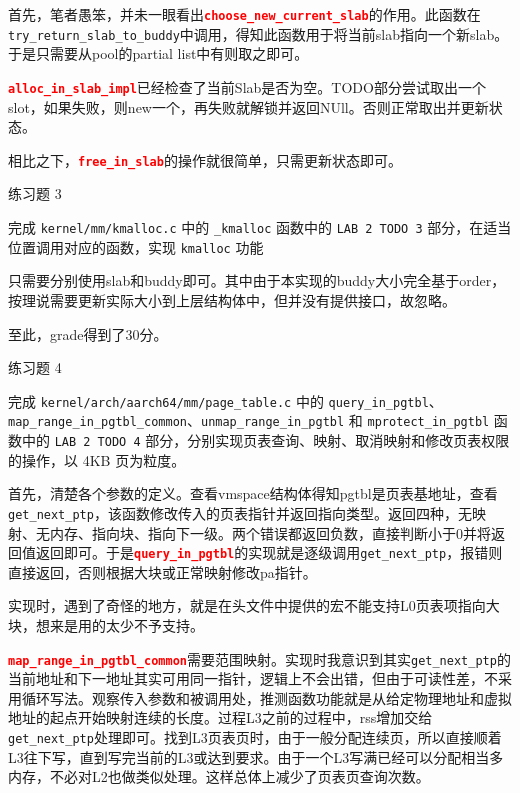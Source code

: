\documentclass{article}
\newcommand{\customthmname}{}
\newenvironment{prob}[1]
{\renewcommand{\customthmname}{#1}%
	\fontfamily{ptm}\selectfont  %
	\par\bigskip\noindent\Large{\customthmname}\normalsize\par}
{\par\bigskip}
\newcommand{\textbff}[1]{\textcolor{red}{\textbf{#1}}}
\begin{document}
	首先，笔者愚笨，并未一眼看出\textbff{\texttt{choose\_new\_current\_slab}}的作用。此函数在\\\texttt{try\_return\_slab\_to\_buddy}中调用，得知此函数用于将当前slab指向一个新slab。于是只需要从pool的partial list中有则取之即可。
	
	\textbff{\texttt{alloc\_in\_slab\_impl}}已经检查了当前Slab是否为空。TODO部分尝试取出一个slot，如果失败，则new一个，再失败就解锁并返回NUll。否则正常取出并更新状态。
	
	相比之下，\textbff{\texttt{free\_in\_slab}}的操作就很简单，只需更新状态即可。
	
	\begin{prob}{练习题 3}
		完成 \texttt{kernel/mm/kmalloc.c} 中的 \texttt{\_kmalloc} 函数中的 \texttt{LAB 2 TODO 3} 部分，在适当位置调用对应的函数，实现 \texttt{kmalloc} 功能
	\end{prob}
	只需要分别使用slab和buddy即可。其中由于本实现的buddy大小完全基于order，按理说需要更新实际大小到上层结构体中，但并没有提供接口，故忽略。
		
	至此，grade得到了30分。
		
	\begin{prob} {练习题 4}
		完成 \texttt{kernel/arch/aarch64/mm/page\_table.c} 中的 \texttt{query\_in\_pgtbl}、\texttt{map\_range\_in\_pgtbl\_common}、\texttt{unmap\_range\_in\_pgtbl} 和 \texttt{mprotect\_in\_pgtbl} 函数中的 \texttt{LAB 2 TODO 4} 部分，分别实现页表查询、映射、取消映射和修改页表权限的操作，以 4KB 页为粒度。
	\end{prob}
	首先，清楚各个参数的定义。查看vmspace结构体得知pgtbl是页表基地址，查看\texttt{get\_next\_ptp}，该函数修改传入的页表指针并返回指向类型。返回四种，无映射、无内存、指向块、指向下一级。两个错误都返回负数，直接判断小于0并将返回值返回即可。于是\textbff{\texttt{query\_in\_pgtbl}}的实现就是逐级调用\texttt{get\_next\_ptp}，报错则直接返回，否则根据大块或正常映射修改pa指针。
	
	实现时，遇到了奇怪的地方，就是在头文件中提供的宏不能支持L0页表项指向大块，想来是用的太少不予支持。
	
	\textbff{\texttt{map\_range\_in\_pgtbl\_common}}需要范围映射。实现时我意识到其实\texttt{get\_next\_ptp}的当前地址和下一地址其实可用同一指针，逻辑上不会出错，但由于可读性差，不采用循环写法。观察传入参数和被调用处，推测函数功能就是从给定物理地址和虚拟地址的起点开始映射连续的长度。过程L3之前的过程中，rss增加交给\texttt{get\_next\_ptp}处理即可。找到L3页表页时，由于一般分配连续页，所以直接顺着L3往下写，直到写完当前的L3或达到要求。由于一个L3写满已经可以分配相当多内存，不必对L2也做类似处理。这样总体上减少了页表页查询次数。
	
\end{document}

